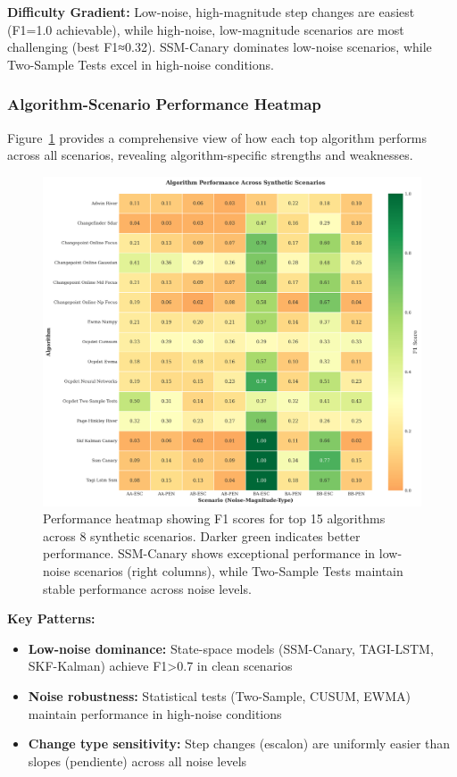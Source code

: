 \begin{table}[H]
\begin{table}[H]
\textbf{Difficulty Gradient:} Low-noise, high-magnitude step changes are easiest (F1=1.0 achievable), while high-noise, low-magnitude scenarios are most challenging (best F1≈0.32). SSM-Canary dominates low-noise scenarios, while Two-Sample Tests excel in high-noise conditions.


\subsubsection{Algorithm-Scenario Performance Heatmap}

Figure~\ref{fig:scenario_heatmap} provides a comprehensive view of how each top algorithm performs across all scenarios, revealing algorithm-specific strengths and weaknesses.

\begin{figure}[htbp]
\centering
\includegraphics[width=\textwidth]{figures/fig_scenario_heatmap.png}
\caption{Performance heatmap showing F1 scores for top 15 algorithms across 8 synthetic scenarios. Darker green indicates better performance. SSM-Canary shows exceptional performance in low-noise scenarios (right columns), while Two-Sample Tests maintain stable performance across noise levels.}
\label{fig:scenario_heatmap}
\end{figure}

\textbf{Key Patterns:} 
\begin{itemize}
\item \textbf{Low-noise dominance:} State-space models (SSM-Canary, TAGI-LSTM, SKF-Kalman) achieve F1>0.7 in clean scenarios
\item \textbf{Noise robustness:} Statistical tests (Two-Sample, CUSUM, EWMA) maintain performance in high-noise conditions
\item \textbf{Change type sensitivity:} Step changes (escalon) are uniformly easier than slopes (pendiente) across all noise levels
\end{itemize}



\end{table}
\end{table}
